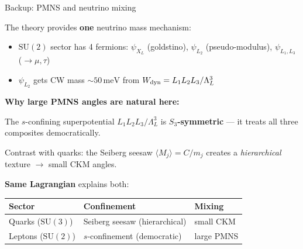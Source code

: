 \documentclass[aspectratio=169,12pt]{beamer}
\begin{document}
\begin{frame}{Backup: PMNS and neutrino mixing}

The theory provides \textbf{one} neutrino mass mechanism:

\medskip
\begin{itemize}
\item $\mathrm{SU}(2)$ sector has 4 fermions:
$\psi_{X_L}$ (goldstino), $\psi_{L_2}$ (pseudo-modulus),
$\psi_{L_1,L_3}$ ($\to \mu, \tau$)
\item $\psi_{L_2}$ gets CW mass $\sim 50\,\text{meV}$
from $W_{\rm dyn} = L_1 L_2 L_3/\Lambda_L^3$
\end{itemize}

\bigskip
\textbf{Why large PMNS angles are natural here:}

\medskip
The $s$-confining superpotential $L_1 L_2 L_3/\Lambda_L^3$
is \textbf{$S_3$-symmetric} --- it treats all three composites
democratically.

\medskip
Contrast with quarks: the Seiberg seesaw $\langle M_j\rangle = C/m_j$
creates a \emph{hierarchical} texture $\to$ small CKM angles.

\medskip
\textbf{Same Lagrangian} explains both:
\begin{center}
\begin{tabular}{lll}
\toprule
Sector & Confinement & Mixing \\
\midrule
Quarks ($\mathrm{SU}(3)$) & Seiberg seesaw (hierarchical)
  & small CKM \\
Leptons ($\mathrm{SU}(2)$) & $s$-confinement (democratic)
  & large PMNS \\
\bottomrule
\end{tabular}
\end{center}

\end{frame}
\end{document}
